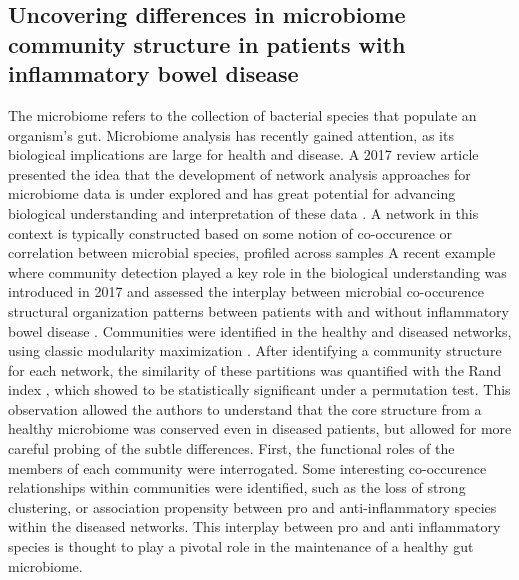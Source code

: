 \subsection{Uncovering differences in microbiome community structure in patients with inflammatory bowel disease}

\indent The microbiome refers to the collection of bacterial species that populate an organism's gut. Microbiome analysis has recently gained attention, as its biological implications are large for health and disease. A 2017 review article presented the idea that the development of network analysis approaches for microbiome data is under explored and has great potential for advancing biological understanding and interpretation of these data \cite{networkMicrobiome}. A network in this context is typically constructed based on some notion of co-occurence or correlation between microbial species, profiled across samples A recent example where community detection played a key role in the biological understanding was introduced in 2017 and assessed the interplay between microbial co-occurence structural organization patterns between patients with and without inflammatory bowel disease \cite{moduleMicrobiome}. Communities were identified in the healthy and diseased networks, using classic modularity maximization \cite{girvancommunity}. After identifying a community structure for each network, the similarity of these partitions was quantified with the Rand index \cite{Rand}, which showed to be statistically significant under a permutation test. This observation allowed the authors to understand that the core structure from a healthy microbiome was conserved even in diseased patients, but allowed for more careful probing of the subtle differences. First, the functional roles of the members of each community were interrogated. Some interesting co-occurence relationships within communities were identified, such as the loss of strong clustering, or association propensity between pro and anti-inflammatory species within the diseased networks. This interplay between pro and anti inflammatory species is thought to play a pivotal role in the maintenance of a healthy gut microbiome. \\
